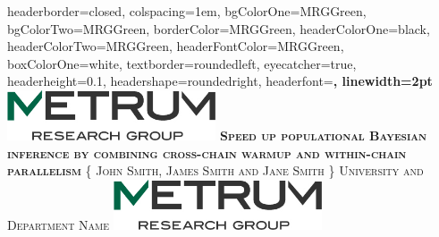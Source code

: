 \documentclass[landscape,a0paper,fontscale=0.45]{baposter} %
\begin{document}
\begin{poster}
{
headerborder=closed, %
colspacing=1em, %
bgColorOne=MRGGreen, %
bgColorTwo=MRGGreen, %
borderColor=MRGGreen, %
headerColorOne=black, %
headerColorTwo=MRGGreen, %
headerFontColor=MRGGreen, %
boxColorOne=white, %
textborder=roundedleft, %
eyecatcher=true, %
headerheight=0.1\textheight, %
headershape=roundedright, %
headerfont=\Large\bf\textsc, %
linewidth=2pt %
}
%
{\includegraphics[height=4em]{graphics/logo.jpg}} %
{\bf\textsc{Speed up populational Bayesian inference by combining cross-chain warmup and within-chain parallelism}\vspace{0.5em}} %
{\textsc{\{ John Smith, James Smith and Jane Smith \} \hspace{12pt} University and Department Name}} %
{\includegraphics[height=4em]{graphics/logo.jpg}} %




\end{poster}
\end{document}
